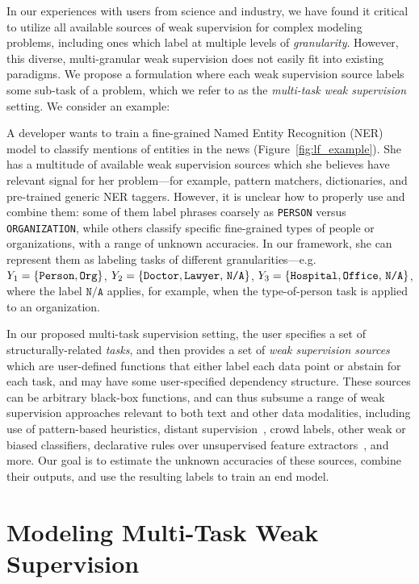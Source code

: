 \documentclass[letterpaper]{article}
\begin{document}
In our experiences with users from science and industry, we have found it critical to utilize all available sources of weak supervision for complex modeling problems, including ones which label at multiple levels of \textit{granularity}.
However, this diverse, multi-granular weak supervision does not easily fit into existing paradigms.
We propose a formulation where each weak supervision source labels some sub-task of a problem, which we refer to as the \textit{multi-task weak supervision} setting.
We consider an example:
\begin{example}
	\label{ex:example-1}
	A developer wants to train a fine-grained Named Entity Recognition (NER) model to classify mentions of entities in the news (Figure~\ref{fig:lf_example}).
	She has a multitude of available weak supervision sources which she believes have relevant signal for her problem---for example, pattern matchers, dictionaries, and pre-trained generic NER taggers.
	However, it is unclear how to properly use and combine them: some of them label phrases coarsely as \texttt{PERSON} versus \texttt{ORGANIZATION}, while others classify specific fine-grained types of people or organizations, with a range of unknown accuracies.
	In our framework, she can represent them as labeling tasks of different granularities---e.g. $Y_1=\{\textrm{\texttt{Person}}, \textrm{\texttt{Org}}\}$, $Y_2=\{\textrm{\texttt{Doctor}}, \textrm{\texttt{Lawyer}, \texttt{N/A}}\}$, $Y_3=\{\textrm{\texttt{Hospital}}, \textrm{\texttt{Office}, \texttt{N/A}}\}$, where the label $\texttt{N/A}$ applies, for example, when the type-of-person task is applied to an organization.
\end{example}

In our proposed multi-task supervision setting, the user specifies a set of structurally-related \textit{tasks}, and then provides a set of \textit{weak supervision sources} which are user-defined functions that either label each data point or abstain for each task, and may have some user-specified dependency structure.
These sources can be arbitrary black-box functions, and can thus subsume a range of weak supervision approaches relevant to both text and other data modalities, including use of pattern-based heuristics, distant supervision~\cite{mintz2009distant}, crowd labels, other weak or biased classifiers, declarative rules over unsupervised feature extractors~\cite{varma2017inferring}, and more.
Our goal is to estimate the unknown accuracies of these sources, combine their outputs, and use the resulting labels to train an end model. 
\section{Modeling Multi-Task Weak Supervision}
\label{sec:label_model}
\end{document}
